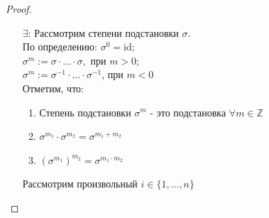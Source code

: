 \documentclass[a4paper, 12pt]{article}
\newcommand{\Z}{\mathbb Z}
\newcommand\tab[1][.5cm]{\hspace*{#1}}
\theoremstyle{definition}
\begin{document}
\begin{proof} \tab
  \begin{itemize}
    \item[ $\exists$: ] Рассмотрим степени подстановки $\sigma$. \\
    По определению: $\sigma^0 = \textrm{id};$ \\ 
    \tab[3.80cm] $\sigma^m := \sigma \cdot ... \cdot \sigma, $ при $m>0;$\\
    \tab[3.80cm] $\sigma^m := \sigma^{-1} \cdot ...\cdot \sigma^{-1}$, при $m<0$ \\
    Отметим, что: \begin{enumerate}
      \item Степень подстановки $\sigma^m$ - это подстановка $\forall m \in \Z$
      \item $\sigma^{m_1}\cdot \sigma^{m_2} = \sigma^{m_1+m_2}$
      \item $(\sigma^{m_1})^{m_2} = \sigma^{m_1 \cdot m_2}$  
    \end{enumerate}
    Рассмотрим произвольный $i \in \{1,...,n\}$
    \begin{center}






\end{center}
\end{itemize}
\end{proof}
\end{document}
